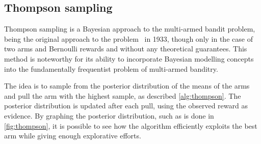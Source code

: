 \subsection{Thompson sampling}
\label{sec:thompson}
Thompson sampling is a Bayesian approach to the multi-armed bandit problem, being the original approach to the problem~\autocite{thompson1933} in 1933, though only in the case of two arms and Bernoulli rewards and without any theoretical guarantees.
This method is noteworthy for its ability to incorporate Bayesian modelling concepts into the fundamentally frequentist problem of multi-armed banditry.

The idea is to sample from the posterior distribution of the means of the arms and pull the arm with the highest sample, as described \cref{alg:thompson}.
The posterior distribution is updated after each pull, using the observed reward as evidence.
By graphing the posterior distribution, such as is done in \cref{fig:thompson}, it is possible to see how the algorithm efficiently exploits the best arm while giving enough explorative efforts.

